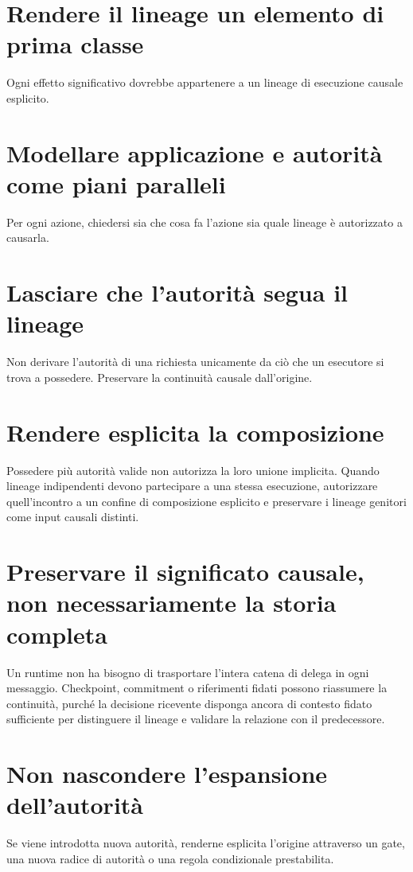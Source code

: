 \documentclass[10pt,oneside,openany]{book}
\begin{document}
\section{Rendere il lineage un elemento di prima classe}
Ogni effetto significativo dovrebbe appartenere a un lineage di esecuzione causale esplicito.

\section{Modellare applicazione e autorità come piani paralleli}
Per ogni azione, chiedersi sia che cosa fa l'azione sia quale lineage è autorizzato a causarla.

\section{Lasciare che l'autorità segua il lineage}
Non derivare l'autorità di una richiesta unicamente da ciò che un esecutore si trova a possedere. Preservare la continuità causale dall'origine.

\section{Rendere esplicita la composizione}
Possedere più autorità valide non autorizza la loro unione implicita. Quando lineage indipendenti devono partecipare a una stessa esecuzione, autorizzare quell'incontro a un confine di composizione esplicito e preservare i lineage genitori come input causali distinti.

\section{Preservare il significato causale, non necessariamente la storia completa}
Un runtime non ha bisogno di trasportare l'intera catena di delega in ogni messaggio. Checkpoint, commitment o riferimenti fidati possono riassumere la continuità, purché la decisione ricevente disponga ancora di contesto fidato sufficiente per distinguere il lineage e validare la relazione con il predecessore.

\section{Non nascondere l'espansione dell'autorità}
Se viene introdotta nuova autorità, renderne esplicita l'origine attraverso un gate, una nuova radice di autorità o una regola condizionale prestabilita.
\end{document}
